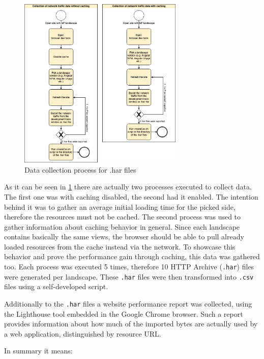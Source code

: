 \begin{figure}[!h]
	\centering
	\includegraphics[width=0.7\textwidth]{Figures/Data_Collection_Process_har.drawio.png}
	\caption{Data collection process for .har files}
	\label{fig:data_collection_process_har}
\end{figure}

As it can be seen in \ref{fig:data_collection_process_har} there are actually two processes executed to collect data. The first one was with caching disabled, the second had it enabled. The intention behind it was to gather an average initial loading time for the picked side, therefore the resources must not be cached. 
The second process was used to gather information about caching behavior in general. Since each landscape contains basically the same views, the browser should be able to pull already loaded resources from the cache instead via the network. To showcase this behavior and prove the performance gain through caching, this data was gathered too.
Each process was executed 5 times, therefore 10 HTTP Archive (\texttt{.har}) files were generated per landscape. These \texttt{.har} files were then transformed into \texttt{.csv} files using a self-developed script. 

Additionally to the \texttt{.har} files a website performance report was collected, using the Lighthouse tool embedded in the Google Chrome browser. Such a report provides information about how much of the imported bytes are actually used by a web application, distinguished by resource URL.

In summary it means:

